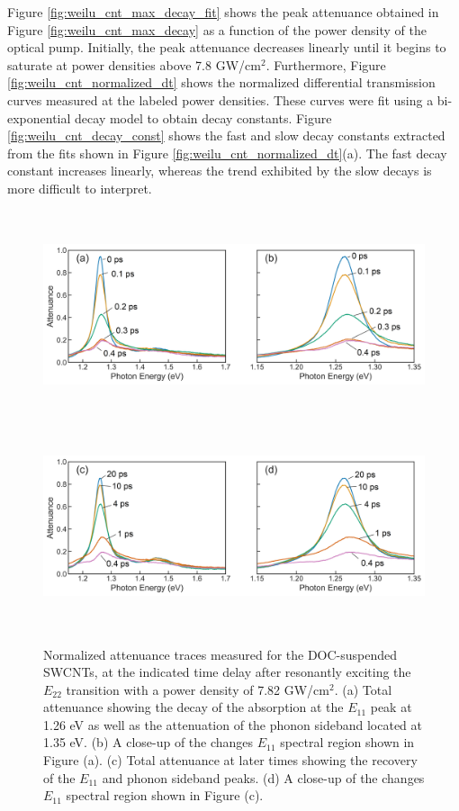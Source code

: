 Figure \ref{fig:weilu_cnt_max_decay_fit} shows the peak attenuance obtained in Figure \ref{fig:weilu_cnt_max_decay} as a function of the power density of the optical pump. Initially, the peak attenuance decreases linearly until it begins to saturate at power densities above 7.8 GW/cm$^2$. Furthermore, Figure \ref{fig:weilu_cnt_normalized_dt} shows the normalized differential transmission curves measured at the labeled power densities. These curves were fit using a bi-exponential decay model to obtain decay constants. Figure \ref{fig:weilu_cnt_decay_const} shows the fast and slow decay constants extracted from the fits shown in Figure \ref{fig:weilu_cnt_normalized_dt}(a). The fast decay constant increases linearly, whereas the trend exhibited by the slow decays is more difficult to interpret.

\begin{figure}[H]
	\centering
	{\includegraphics[height=2.4in]{images/chapter_my_data/Weilu_CNT_4mW_E11_decay_relabeled} }
	{\includegraphics[height=2.4in]{images/chapter_my_data/Weilu_CNT_4mW_E11_recovery_relabeled} }
	\caption{Normalized attenuance traces measured for the DOC-suspended SWCNTs, at the indicated time delay after resonantly exciting the $E_{22}$ transition with a power density of 7.82 GW/cm$^2$. (a) Total attenuance showing the decay of the absorption at the $E_{11}$ peak at 1.26 eV as well as the attenuation of the phonon sideband located at 1.35 eV. (b) A close-up of the changes $E_{11}$ spectral region shown in Figure (a). (c) Total attenuance at later times showing the recovery of the $E_{11}$ and phonon sideband peaks. (d) A close-up of the changes $E_{11}$ spectral region shown in Figure (c).}
	\label{fig:weilu_cnt_time_traces}
\end{figure}

